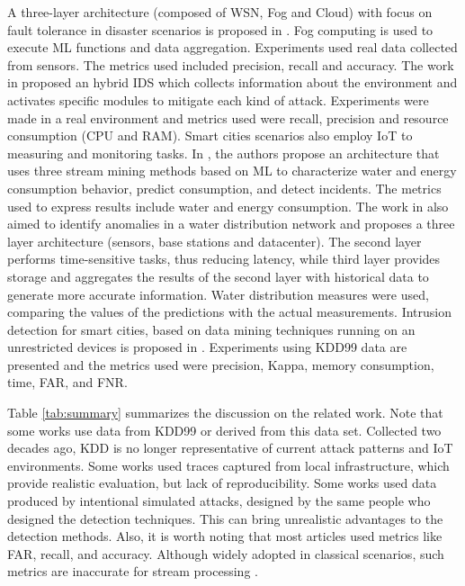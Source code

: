 A three-layer architecture (composed of WSN, Fog and Cloud) with focus on fault
tolerance in disaster scenarios is proposed in \cite{Fault-tolerance-disaster}.
Fog computing is used to execute ML functions and data aggregation. Experiments
used real data collected from sensors. The metrics used included precision,
recall and accuracy.
%
The work in \cite{Kalis} proposed an hybrid IDS which collects information about
the environment and activates specific modules to mitigate each kind of attack.
Experiments were made in a real environment and metrics used were recall,
precision and resource consumption (CPU and RAM).
%
Smart cities scenarios also employ IoT to measuring and monitoring tasks.
In \cite{IoT-arch-smartmeter}, the authors propose an architecture that uses
three stream mining methods based on ML to characterize water and energy
consumption behavior, predict consumption, and detect incidents.
The metrics used to express results include water and energy consumption.
%
The work in \cite{scalable-anomaly-detection-smart-city} also aimed to identify
anomalies in a water distribution network and proposes a three layer
architecture (sensors, base stations and datacenter).
The second layer performs time-sensitive tasks, thus reducing latency, while
third layer provides storage and aggregates the results of the second layer with
historical data to generate more accurate information.
Water distribution measures were used, comparing the values of the predictions
with the actual measurements.
%
Intrusion detection for smart cities, based on data mining techniques running on
an unrestricted devices is proposed in \cite{DS-based-IDS-SmartGrid}.
Experiments using KDD99 data are presented and the metrics used were precision,
Kappa, memory consumption, time, FAR, and FNR.


Table \ref{tab:summary} summarizes the discussion on the related work.
Note that some works use data from KDD99 or derived from this data set.
Collected two decades ago, KDD is no longer representative of current attack
patterns and IoT environments.
Some works used traces captured from local infrastructure, which provide
realistic evaluation, but lack of reproducibility.
Some works used data produced by intentional simulated attacks, designed by the
same people who designed the detection techniques.
This can bring unrealistic advantages to the detection methods.
Also, it is worth noting that most articles used metrics like FAR, recall, and
accuracy.
Although widely adopted in classical scenarios, such metrics are inaccurate for
stream processing \cite{GAMA2010}.


